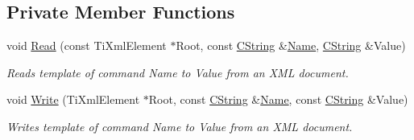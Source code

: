 \subsection*{Private Member Functions}
\begin{DoxyCompactItemize}
\item 
void \hyperlink{classCPlatform_a534ebff7f33e81d4f0c0b94b81c3cf39}{Read} (const Ti\-Xml\-Element $\ast$Root, const \hyperlink{classCString}{C\-String} \&\hyperlink{classCPlatform_aaafbc804cfe1a921cfb8e6eccad1572f}{Name}, \hyperlink{classCString}{C\-String} \&Value)
\begin{DoxyCompactList}\small\item\em Reads template of command {\itshape Name} to {\itshape Value} from an X\-M\-L document. \end{DoxyCompactList}\item 
void \hyperlink{classCPlatform_a9e61b1818a32e9851ae141fdedcae2b5}{Write} (Ti\-Xml\-Element $\ast$Root, const \hyperlink{classCString}{C\-String} \&\hyperlink{classCPlatform_aaafbc804cfe1a921cfb8e6eccad1572f}{Name}, const \hyperlink{classCString}{C\-String} \&Value)
\begin{DoxyCompactList}\small\item\em Writes template of command {\itshape Name} to {\itshape Value} from an X\-M\-L document. \end{DoxyCompactList}\end{DoxyCompactItemize}
